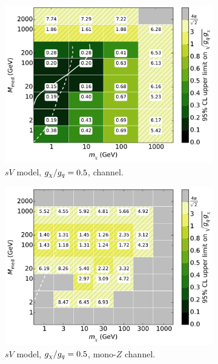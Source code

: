 \begin{figure}
  \centering
  \begin{subfigure}[t]{0.32\textwidth}
    \centering
    \includegraphics[width=1.\textwidth]{figures/grid_basepoints_SVD_rat05_monojet.pdf}
    \caption{$sV$ model, $g_{\chi}/g_q = 0.5$, \monojet channel.}
  \end{subfigure}
  \begin{subfigure}[t]{0.32\textwidth}
    \centering
    \includegraphics[width=1.\textwidth]{figures/grid_allpoints_SVD_rat05.pdf}
    \caption{$sV$ model, $g_{\chi}/g_q = 0.5$, mono-$Z$ channel.}
  \end{subfigure}
  \begin{subfigure}[t]{0.32\textwidth}

\end{subfigure}
\end{figure}

